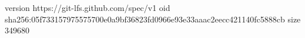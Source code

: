 version https://git-lfs.github.com/spec/v1
oid sha256:05f733157975575700e0a9bf36823fd0966e93e33aaac2eecc421140fc5888cb
size 349680

